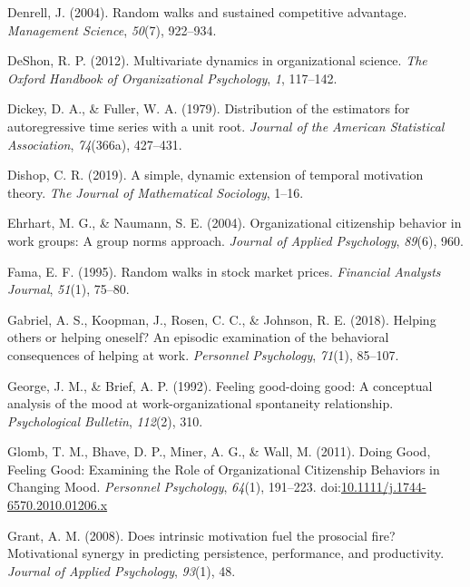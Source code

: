 \documentclass[english,,man]{apa6}
\theoremstyle{definition}
\theoremstyle{definition}
\theoremstyle{definition}
\theoremstyle{remark}
\begin{document}
\leavevmode\hypertarget{ref-denrell2004random}{}%
Denrell, J. (2004). Random walks and sustained competitive advantage.
\emph{Management Science}, \emph{50}(7), 922--934.

\leavevmode\hypertarget{ref-deshon_multivariate_2012}{}%
DeShon, R. P. (2012). Multivariate dynamics in organizational science.
\emph{The Oxford Handbook of Organizational Psychology}, \emph{1},
117--142.

\leavevmode\hypertarget{ref-dickey_distribution_1979}{}%
Dickey, D. A., \& Fuller, W. A. (1979). Distribution of the estimators
for autoregressive time series with a unit root. \emph{Journal of the
American Statistical Association}, \emph{74}(366a), 427--431.

\leavevmode\hypertarget{ref-dishop_simple_2019}{}%
Dishop, C. R. (2019). A simple, dynamic extension of temporal motivation
theory. \emph{The Journal of Mathematical Sociology}, 1--16.

\leavevmode\hypertarget{ref-ehrhart2004organizational}{}%
Ehrhart, M. G., \& Naumann, S. E. (2004). Organizational citizenship
behavior in work groups: A group norms approach. \emph{Journal of
Applied Psychology}, \emph{89}(6), 960.

\leavevmode\hypertarget{ref-fama1995random}{}%
Fama, E. F. (1995). Random walks in stock market prices. \emph{Financial
Analysts Journal}, \emph{51}(1), 75--80.

\leavevmode\hypertarget{ref-gabriel_helping_2018}{}%
Gabriel, A. S., Koopman, J., Rosen, C. C., \& Johnson, R. E. (2018).
Helping others or helping oneself? An episodic examination of the
behavioral consequences of helping at work. \emph{Personnel Psychology},
\emph{71}(1), 85--107.

\leavevmode\hypertarget{ref-george1992feeling}{}%
George, J. M., \& Brief, A. P. (1992). Feeling good-doing good: A
conceptual analysis of the mood at work-organizational spontaneity
relationship. \emph{Psychological Bulletin}, \emph{112}(2), 310.

\leavevmode\hypertarget{ref-glomb_doing_2011}{}%
Glomb, T. M., Bhave, D. P., Miner, A. G., \& Wall, M. (2011). Doing
Good, Feeling Good: Examining the Role of Organizational Citizenship
Behaviors in Changing Mood. \emph{Personnel Psychology}, \emph{64}(1),
191--223.
doi:\href{https://doi.org/10.1111/j.1744-6570.2010.01206.x}{10.1111/j.1744-6570.2010.01206.x}

\leavevmode\hypertarget{ref-grant_does_2008}{}%
Grant, A. M. (2008). Does intrinsic motivation fuel the prosocial fire?
Motivational synergy in predicting persistence, performance, and
productivity. \emph{Journal of Applied Psychology}, \emph{93}(1), 48.
\end{document}

